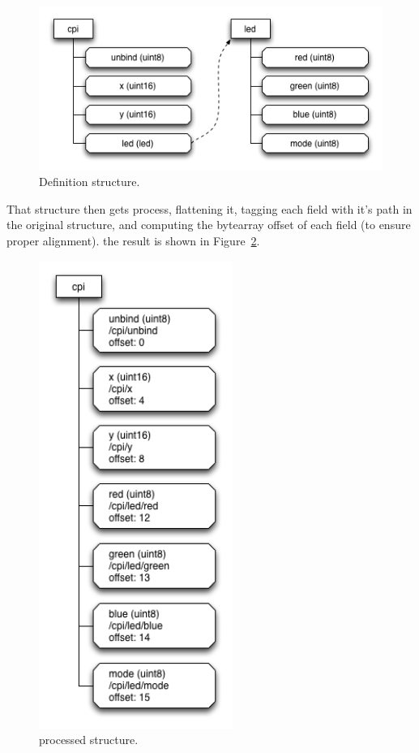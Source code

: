 \documentclass[12pt]{report}
\begin{document}
\begin{figure}[htbp] %
   \centering
   \includegraphics[width=5in]{def_structure.png} 
\caption{Definition structure.}
\label{fig:blockdiagram}
\end{figure}

That structure then gets process, flattening it, tagging each field
with it's path in the original structure, and computing the bytearray
offset of each field (to ensure proper alignment). the result is shown
in Figure~\ref{fig:flattened}.

\begin{figure}[htbp] %
   \centering
   \includegraphics[height=6in]{flat_structure.png} 
\caption{processed structure.}
\label{fig:flattened}
\end{figure}
\end{document}

